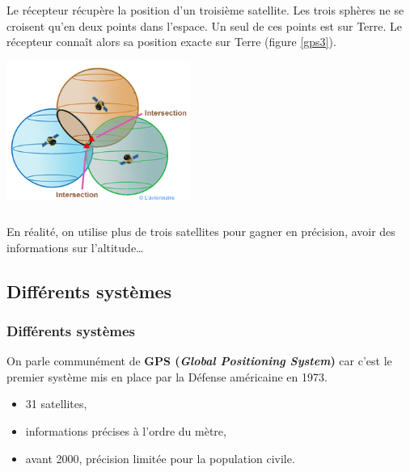 \documentclass[svgnames,11pt]{beamer}
\begin{document}
\begin{frame}
    \frametitle{}

    Le récepteur récupère la position d'un troisième satellite. Les trois sphères ne se croisent qu'en deux points dans l'espace. Un seul de ces points est sur Terre. Le récepteur connaît alors sa position exacte sur Terre (figure \ref{gps3}).
    \begin{center}
        \centering
        \includegraphics[width=6cm]{ressources/gps3.png}

        \label{gps3}
    \end{center}

\end{frame}
\begin{frame}
    \frametitle{}

    \begin{aretenir}[Remarque]
        En réalité, on utilise plus de trois satellites pour gagner en précision, avoir des informations sur l'altitude\dots
    \end{aretenir}

\end{frame}
\subsection{Différents systèmes}
\begin{frame}
    \frametitle{Différents systèmes}
    On parle communément de \textbf{GPS (\emph{Global Positioning System})} car c'est le premier système mis en place par la Défense américaine en 1973. 
    \begin{itemize}
        \item 31 satellites,
        \item informations précises à l'ordre du mètre,
        \item avant 2000, précision limitée pour la population civile.
    \end{itemize}


\end{frame}
\end{document}

